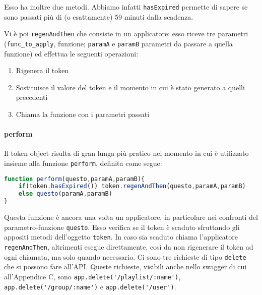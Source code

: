 Esso ha inoltre due metodi.
Abbiamo infatti \verb|hasExpired| permette di sapere se sono passati più di (o esattamente) 59 minuti dalla scadenza.


Vi è poi \verb|regenAndThen| che consiste in un applicatore: esso riceve tre parametri (\verb|func_to_apply|, funzione; \verb|paramA| e \verb|paramB| parametri da passare a quella funzione) ed effettua le seguenti operazioni:

\begin{enumerate}
    \item Rigenera il token
    \item Sostituisce il valore del token e il momento in cui è stato generato a quelli precedenti
    \item Chiama la funzione con i parametri passati
\end{enumerate}
\paragraph{perform} Il token object risulta di gran lunga più pratico nel momento in cui è utilizzato insieme alla funzione \verb|perform|, definita come segue:
\begin{lstlisting}[language=JavaScript]
function perform(questo,paramA,paramB){
    if(token.hasExpired()) token.regenAndThen(questo,paramA,paramB)
    else questo(paramA,paramB)
}
\end{lstlisting}
Questa funzione è ancora una volta un applicatore, in particolare nei confronti del parametro-funzione \verb|questo|. Esso verifica se il token è scaduto sfruttando gli appositi metodi dell'oggetto \verb|token|. In caso sia scaduto chiama l'applicatore \verb|regenAndThen|, altrimenti esegue direttamente, così da non rigenerare il token ad ogni chiamata, ma solo quando necessario.
Ci sono tre richieste di tipo \verb|delete| che si possono fare all'API. Queste richieste, visibili anche nello swagger di cui all'Appendice C, sono \verb|app.delete('/playlist/:name')|, \verb|app.delete('/group/:name')| e \verb|app.delete('/user')|.

